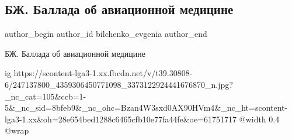  
 
 
 
 
 
\subsection{БЖ. Баллада об авиационной медицине}
\label{sec:20_10_2021.fb.bilchenko_evgenia.2.ballada_avia_medicina}
 
\ifcmt
 author_begin
   author_id bilchenko_evgenia
 author_end
\fi

БЖ. Баллада об авиационной медицине

\ifcmt
  ig https://scontent-lga3-1.xx.fbcdn.net/v/t39.30808-6/247137800_4359306450771098_3373122924441676870_n.jpg?_nc_cat=105&ccb=1-5&_nc_sid=8bfeb9&_nc_ohc=Bzan4W3sxd0AX90HVm4&_nc_ht=scontent-lga3-1.xx&oh=28e654bed1288c6465cfb10e77fa44fe&oe=61751717
  @width 0.4
  @wrap 
\fi

